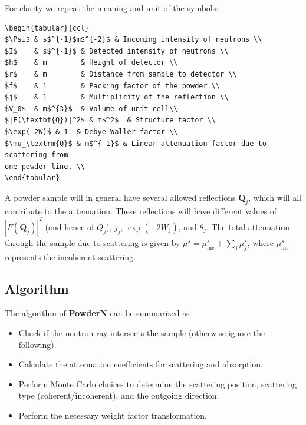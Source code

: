 For clarity we repeat the meaning and unit of the symbols:
%
\begin{lstlisting}
\begin{tabular}{ccl}
$\Psi$ & s$^{-1}$m$^{-2}$ & Incoming intensity of neutrons \\
$I$    & s$^{-1}$ & Detected intensity of neutrons \\
$h$    & m        & Height of detector \\
$r$    & m        & Distance from sample to detector \\
$f$    & 1        & Packing factor of the powder \\
$j$    & 1        & Multiplicity of the reflection \\
$V_0$  & m$^{3}$  & Volume of unit cell\\
$|F(\textbf{Q})|^2$ & m$^2$  & Structure factor \\
$\exp(-2W)$ & 1  & Debye-Waller factor \\
$\mu_\textrm{Q}$ & m$^{-1}$ & Linear attenuation factor due to scattering from
one powder line. \\
\end{tabular}
\end{lstlisting}
%

A powder sample will in general have several allowed reflections
$\textbf{Q}_j$, which will all contribute to the attenuation.
These reflections will have different values of
$|F(\textbf{Q}_j)|^2$ (and hence of $Q_j$), $j_j$, $\exp(-2W_j)$,
and $\theta_j$.
The total attenuation through the sample due to scattering is given by
$\mu^s = \mu_\textrm{inc}^s + \sum_j \mu^s_j $,
where $\mu_\textrm{inc}^s$ represents the incoherent scattering.

\subsection{Algorithm}
The algorithm of \textbf{PowderN} can be summarized as
\begin{itemize}
\item Check if the neutron ray intersects the sample (otherwise ignore
the following).
\item Calculate the attenuation coefficients for scattering and absorption.
\item Perform Monte Carlo choices to determine the scattering position,
scattering type (coherent/incoherent), and the outgoing direction.
\item Perform the necessary weight factor transformation.
\end{itemize}

